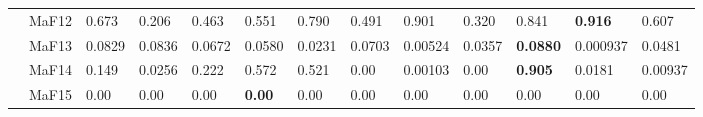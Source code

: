 \documentclass[]{article}
\begin{document}
\begin{landscape}
\begin{table}
\begin{footnotesize}
\begin{tabular}{|l|l|l|l|l|l|l|l|l|l|l|l|l|}
 & MaF12 & 0.673 & 0.206 & 0.463 & 0.551 & \cellcolor{gray95} 0.790 & 0.491 & \cellcolor{gray95} 0.901 & 0.320 & \cellcolor{gray95} 0.841 & \cellcolor{gray95} {\bf 0.916} & 0.607\\
 & MaF13 & \cellcolor{gray95} 0.0829 & \cellcolor{gray95} 0.0836 & 0.0672 & 0.0580 & 0.0231 & 0.0703 & 0.00524 & 0.0357 & \cellcolor{gray95} {\bf 0.0880} & 0.000937 & 0.0481\\
 & MaF14 & 0.149 & 0.0256 & 0.222 & \cellcolor{gray95} 0.572 & \cellcolor{gray95} 0.521 & 0.00 & 0.00103 & 0.00 & \cellcolor{gray95} {\bf 0.905} & 0.0181 & 0.00937\\
 & MaF15 & \cellcolor{gray95} 0.00 & \cellcolor{gray95} 0.00 & \cellcolor{gray95} 0.00 & \cellcolor{gray95} {\bf 0.00} & \cellcolor{gray95} 0.00 & \cellcolor{gray95} 0.00 & \cellcolor{gray95} 0.00 & \cellcolor{gray95} 0.00 & \cellcolor{gray95} 0.00 & \cellcolor{gray95} 0.00 & \cellcolor{gray95} 0.00\\
\hline
\end{tabular}
\end{footnotesize}
\end{table}
\end{landscape}
\end{document}

